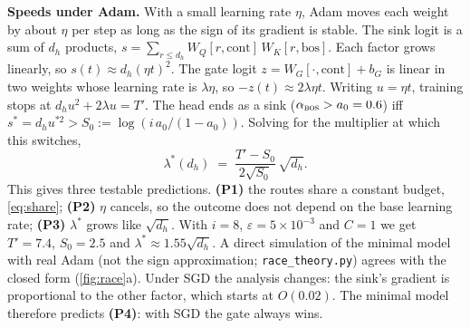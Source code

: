 \documentclass{article} %
\newcommand{\bos}{\textsc{bos}}
\begin{document}
\textbf{Speeds under Adam.} With a small learning rate $\eta$, Adam moves each weight by about $\eta$ per step as
long as the sign of its gradient is stable. The sink logit is a sum of $d_h$ products,
$s=\sum_{r\le d_h}W_Q[r,\text{cont}]\,W_K[r,\text{bos}]$. Each factor grows linearly, so
$s(t)\approx d_h(\eta t)^2$. The gate logit $z=W_G[\cdot,\text{cont}]+b_G$ is linear in two weights whose
learning rate is $\lambda\eta$, so $-z(t)\approx 2\lambda\eta t$. Writing $u=\eta t$, training stops at
$d_hu^2+2\lambda u=T'$. The head ends as a sink ($\alpha_\bos>a_0=0.6$) iff
$s^*=d_hu^{*2}>S_0:=\log(i\,a_0/(1-a_0))$. Solving for the multiplier at which this switches,
\begin{equation}
\lambda^*(d_h) \;=\; \frac{T'-S_0}{2\sqrt{S_0}}\,\sqrt{d_h}.
\label{eq:lamstar}
\end{equation}
This gives three testable predictions.
\textbf{(P1)} the routes share a constant budget, \cref{eq:share};
\textbf{(P2)} $\eta$ cancels, so the outcome does not depend on the base learning rate;
\textbf{(P3)} $\lambda^*$ grows like $\sqrt{d_h}$.
With $i=8$, $\varepsilon=5\times10^{-3}$ and $C=1$ we get $T'=7.4$, $S_0=2.5$ and $\lambda^*\approx1.55\sqrt{d_h}$.
A direct simulation of the minimal model with real Adam (not the sign approximation; \texttt{race\_theory.py})
agrees with the closed form (\cref{fig:race}a). Under SGD the analysis changes: the sink's gradient is
proportional to the other factor, which starts at $O(0.02)$. The minimal model therefore predicts
\textbf{(P4)}: with SGD the gate always wins.
\end{document}
